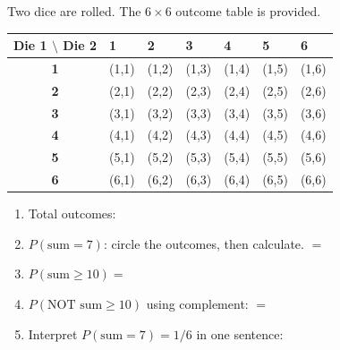 \documentclass[10pt]{article}
\begin{document}
\vspace{0.1in}

\begin{practicebox}
\small Two dice are rolled. The $6 \times 6$ outcome table is provided.

\vspace{4pt}
\renewcommand{\arraystretch}{1.3}
\begin{tabularx}{\linewidth}{@{} c | *{6}{>{\centering\arraybackslash}X} @{}}
\textbf{Die 1 $\setminus$ Die 2} & \textbf{1} & \textbf{2} & \textbf{3} & \textbf{4} & \textbf{5} & \textbf{6} \\
\hline
\textbf{1} & (1,1) & (1,2) & (1,3) & (1,4) & (1,5) & (1,6) \\
\textbf{2} & (2,1) & (2,2) & (2,3) & (2,4) & (2,5) & (2,6) \\
\textbf{3} & (3,1) & (3,2) & (3,3) & (3,4) & (3,5) & (3,6) \\
\textbf{4} & (4,1) & (4,2) & (4,3) & (4,4) & (4,5) & (4,6) \\
\textbf{5} & (5,1) & (5,2) & (5,3) & (5,4) & (5,5) & (5,6) \\
\textbf{6} & (6,1) & (6,2) & (6,3) & (6,4) & (6,5) & (6,6) \\
\end{tabularx}

\vspace{6pt}
\begin{enumerate}[leftmargin=1.5em, itemsep=8pt]
  \item Total outcomes: 
  \item $P(\text{sum} = 7)$: circle the outcomes, then calculate. $=$ 
  \item $P(\text{sum} \geq 10) = $ 
  \item $P(\text{NOT sum} \geq 10)$ using complement: $=$ 
  \item Interpret $P(\text{sum} = 7) = 1/6$ in one sentence:
\end{enumerate}
\end{practicebox}
\end{document}
